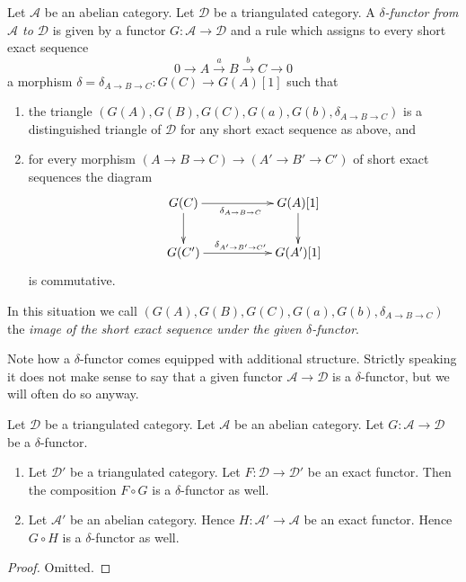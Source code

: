 \begin{definition}
\label{definition-delta-functor}
Let $\mathcal{A}$ be an abelian category.
Let $\mathcal{D}$ be a triangulated category.
A {\it $\delta$-functor from $\mathcal{A}$ to $\mathcal{D}$} is
given by a functor $G : \mathcal{A} \to \mathcal{D}$ and
a rule which assigns to every short exact sequence
$$
0 \to A \xrightarrow{a} B \xrightarrow{b} C \to 0
$$
a morphism $\delta = \delta_{A \to B \to C} : G(C) \to G(A)[1]$
such that
\begin{enumerate}
\item the triangle
$(G(A), G(B), G(C), G(a), G(b), \delta_{A \to B \to C})$
is a distinguished triangle of $\mathcal{D}$
for any short exact sequence as above, and
\item for every morphism $(A \to B \to C) \to (A' \to B' \to C')$
of short exact sequences the diagram
$$
\xymatrix{
G(C) \ar[d] \ar[rr]_{\delta_{A \to B \to C}} & &
G(A)[1] \ar[d] \\
G(C') \ar[rr]^{\delta_{A' \to B' \to C'}} & &
G(A')[1]
}
$$
is commutative.
\end{enumerate}
In this situation we call
$(G(A), G(B), G(C), G(a), G(b), \delta_{A \to B \to C})$
the {\it image of the short exact sequence under the
given $\delta$-functor}.
\end{definition}

\noindent
Note how a $\delta$-functor comes equipped with additional structure.
Strictly speaking it does not make sense to say that a given
functor $\mathcal{A} \to \mathcal{D}$ is a $\delta$-functor, but we
will often do so anyway.

\begin{lemma}
\label{lemma-exact-compose-delta-functor}
Let $\mathcal{D}$ be a triangulated category.
Let $\mathcal{A}$ be an abelian category.
Let $G : \mathcal{A} \to \mathcal{D}$ be a $\delta$-functor.
\begin{enumerate}
\item Let $\mathcal{D}'$ be a triangulated category.
Let $F : \mathcal{D} \to \mathcal{D}'$ be an exact functor.
Then the composition $F \circ G$ is a $\delta$-functor as well.
\item Let $\mathcal{A}'$ be an abelian category. Hence
$H : \mathcal{A}' \to \mathcal{A}$ be an exact functor.
Hence $G \circ H$ is a $\delta$-functor as well.
\end{enumerate}
\end{lemma}

\begin{proof}
Omitted.
\end{proof}

